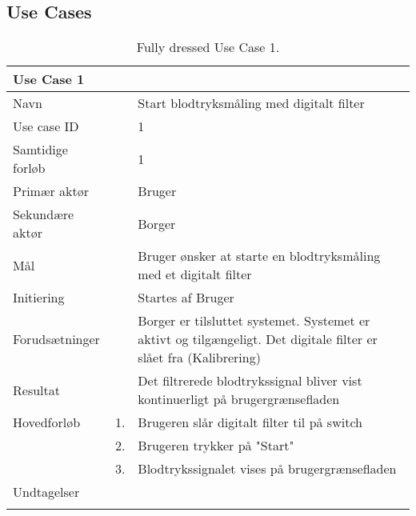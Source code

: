 \subsection{Use Cases}

\begin{longtabu} to  %
    {\large \textbf{Use Case 1}} && \\
    \toprule
    Navn &&    Start blodtryksmåling med digitalt filter\\
    Use case ID &&    1\\
    Samtidige forløb &&    1\\
    Primær aktør &&    Bruger\\
    Sekundære aktør &&	Borger \\
    Mål &&    Bruger ønsker at starte en blodtryksmåling med et digitalt filter\\
    Initiering &&	Startes af Bruger\\
    Forudsætninger &&  Borger er tilsluttet systemet. Systemet er aktivt og tilgængeligt. Det digitale filter er slået fra (Kalibrering)  \\
    Resultat &&		Det filtrerede blodtrykssignal bliver vist kontinuerligt på brugergrænsefladen                         \\ \midrule
    Hovedforløb &    1. &    Brugeren slår digitalt filter til på switch\\[-1ex]   						 	
                &    2. &    Brugeren trykker på "Start"\\[-1ex]
                &    3.	&	 Blodtrykssignalet vises på brugergrænsefladen\newline\\ \midrule
                
    Undtagelser &     &      \\ \bottomrule
\caption{Fully dressed Use Case 1.}
\label{UC1}
\end{longtabu}


